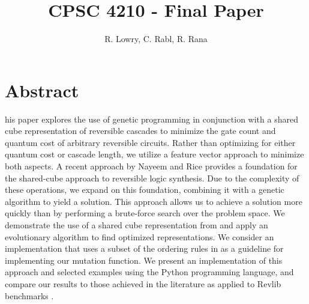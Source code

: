 \documentclass[12pt]{article}
\title{CPSC 4210 - Final Paper}
\author{R. Lowry, C. Rabl, R. Rana}
\date{}
\begin{document}
\maketitle

\section*{Abstract}

his paper explores the use of genetic programming in conjunction with a shared cube representation of reversible cascades to minimize the gate count and quantum cost of arbitrary reversible circuits. Rather than optimizing for either quantum cost or cascade length, we utilize a feature vector approach to minimize both aspects. A recent approach by Nayeem and Rice provides a foundation for the shared-cube approach to reversible logic synthesis. Due to the complexity of these operations, we expand on this foundation, combining it with a genetic algorithm to yield a solution. This approach allows us to achieve a solution more quickly than by performing a brute-force search over the problem space.
We demonstrate the use of a shared cube representation from \cite{Nayeem2011} and apply an evolutionary algorithm to find optimized representations. We consider an implementation that uses a subset of the ordering rules in \cite{Rice2011} as a guideline for implementing our mutation function. We present an implementation of this approach and selected examples using the Python programming language, and compare our results to those achieved in the literature as applied to Revlib benchmarks \cite{RevLib}.







\pagebreak


\end{document}
